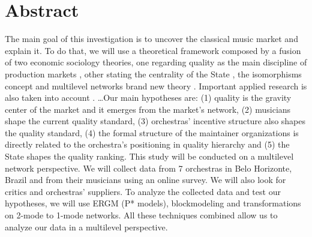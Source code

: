 \documentclass[a4paper, 12pt, openright, oneside, german, french, brazil, english, article]{abntex2}
\begin{document}
	\textual
	\maketitle
	
	\section*{Abstract}
		The main goal of this investigation is to uncover the classical music market and explain it. To do that, we will use a theoretical framework composed by a fusion of two economic sociology theories, one regarding quality as the main discipline of production markets \cite{white2002markets}, other stating the centrality of the State \cite{fligstein2002architecture}, the isomorphisms concept \cite{dimaggio1983iron} and multilevel networks brand new theory \cite{lazega2016multilevel}. Important applied research is also taken into account \cite{favereau2002markets,franccois2005monde,biencourt2002market}. \ldots Our main hypotheses are: (1) quality is the gravity center of the market and it emerges from the market's network, (2) musicians shape the current quality standard, (3) orchestras' incentive structure also shapes the quality standard, (4) the formal structure of the maintainer organizations is directly related to the orchestra's positioning in quality hierarchy and (5) the State shapes the quality ranking. This study will be conducted on a multilevel network perspective. We will collect data from 7 orchestras in Belo Horizonte, Brazil and from their musicians using an online survey. We will also look for critics and orchestras' suppliers. To analyze the collected data and test our hypotheses, we will use ERGM (P* models), blockmodeling and transformations on 2-mode to 1-mode networks. All these techniques combined allow us to analyze our data in a multilevel perspective.	
		
		
		
				
	\postextual
	
	
	\anexos
	
\end{document}
